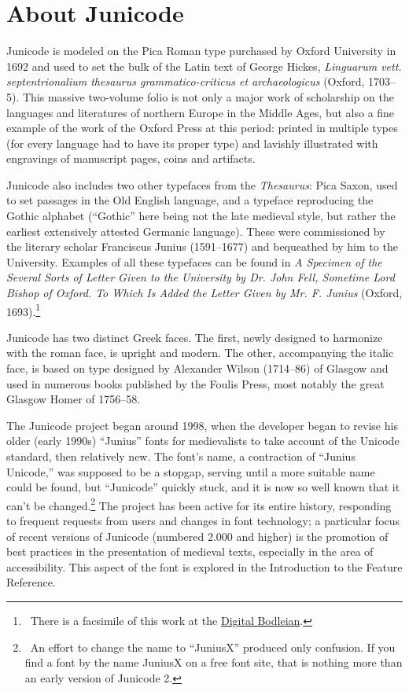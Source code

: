 
\hypertarget{aboutj}{}\chapter{About Junicode}

{\large%
\noindent Junicode is modeled on the Pica Roman type
purchased by Oxford University in 1692 and
used to set the bulk of the Latin text of George Hickes,
{\itshape Linguarum vett. septentrionalium thesaurus
grammatico-criticus et archaeologicus} (Oxford, 1703–5). This massive two-volume folio
is not only a major work of scholarship on the languages and literatures
of northern Europe in the Middle Ages, but also a fine
example of the work of the Oxford Press at this
period: printed in multiple types (for every language had to
have its proper type) and lavishly
illustrated with engravings of manuscript pages, coins and
artifacts.

Junicode also includes two other typefaces from the \textit{Thesaurus}:
Pica Saxon, used to set passages in the Old English language,
and a typeface reproducing the Gothic alphabet (“Gothic” here
being not the late medieval style, but rather
the earliest extensively attested Germanic language).
These were commissioned by the literary scholar
Francis\-cus Junius (1591–1677) and bequeathed by him to
the University. Examples of all these typefaces can be found
in {\itshape A Specimen of the
Several Sorts of Letter Given to the University by Dr. John Fell,
Sometime Lord Bishop of Oxford. To Which Is Added the Letter Given by
Mr. F. Junius} (Oxford, 1693).\footnote{\ There is a facsimile of this
work at the
\href{https://digital.bodleian.ox.ac.uk/objects/876b73f0-3e03-41c1-9fd1-0688a1785561/}{Digital Bodleian}.}

Junicode has two distinct Greek faces. The first, newly designed to harmonize with the roman face, is
up\-right and modern. The other, accompanying the italic face, is based on type designed by Alexander
Wilson (1714–86) of Glasgow and used in numerous books published by
the Foulis Press, most notably the great Glasgow Homer of 1756–58.

The Junicode project began around 1998, when the developer began to revise his
older (early 1990s) “Junius” fonts for medievalists to take account of the Unicode
standard, then relatively new. The font’s name, a contraction of
“Junius Unicode,” was supposed to be a stopgap, serving until a more suitable name
could be found, but “Junicode” quickly stuck, and it is now so well known that it can’t be
changed.\footnote{\ An effort to change the name to “JuniusX” produced
only confusion. If you find a font by the name JuniusX on a free font site,
that is nothing more than an early version of Junicode 2.}
The project has been active for its entire history, responding to frequent
requests from users and changes in font technology; a particular focus of
recent versions of Junicode (numbered 2.000 and higher) is the promotion of best practices in the presentation
of medieval texts, especially in
the area of accessibility. This aspect of the font is explored in the
Introduction to the Feature Reference.

}
\pagestyle{fancy}

